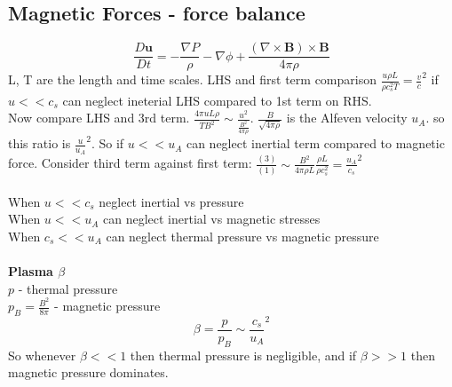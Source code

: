\documentclass{article}
\begin{document}
\subsection{Magnetic Forces - force balance}
$$
\frac{D \bm u}{Dt} = - \frac{\nabla P}{\rho} - \nabla \phi + \frac{(\nabla \times \bm B) \times \bm B}{4 \pi \rho}
$$
L, T are the length and time scales. LHS and first term comparison $\frac{u \rho L}{\rho c_s^2 T} = \frac{v}{c}^2$ if $u<<c_s$ can neglect ineterial LHS compared to 1st term on RHS.\\
Now compare LHS and 3rd term. $\frac{4\pi uL\rho}{TB^2} \sim \frac{u^2}{\frac{B^2}{4\pi \rho}}$. $ \frac{B}{\sqrt{4\pi \rho}}$ is the Alfeven velocity $u_A$. so this ratio is $\frac{u}{u_A}^2$. So if $u << u_A$ can neglect inertial term compared to magnetic force. Consider third term against first term: $\frac{(3)}{(1)} \sim \frac{B^2}{4\pi \rho L}\frac{\rho L}{\rho c_s^2} = \frac{u_A}{c_s}^2$
\\\\
\noindent
When $u << c_s$ neglect inertial vs pressure\\
When $u << u_A$ can neglect inertial vs magnetic stresses\\
When $c_s << u_A$ can neglect thermal pressure vs magnetic pressure\\ \\
\textbf{Plasma $\beta$ }\\
$p$ - thermal pressure\\
$p_B = \frac{B^2}{8\pi}$ - magnetic pressure\\
$$
\beta = \frac{p}{p_B} \sim \frac{c_s}{u_A}^2
$$
So whenever $\beta <<1$ then thermal pressure is negligible, and if $\beta >>1$ then magnetic pressure dominates.\\
\end{document}
